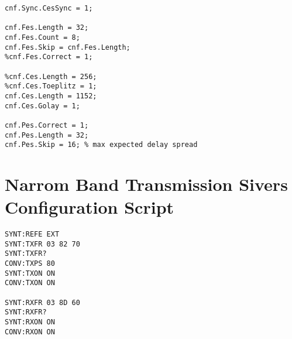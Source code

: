 \begin{appendix}
\begin{verbatim}
cnf.Sync.CesSync = 1;

cnf.Fes.Length = 32;
cnf.Fes.Count = 8;
cnf.Fes.Skip = cnf.Fes.Length;
%cnf.Fes.Correct = 1;

%cnf.Ces.Length = 256;
%cnf.Ces.Toeplitz = 1;
cnf.Ces.Length = 1152;
cnf.Ces.Golay = 1;

cnf.Pes.Correct = 1;
cnf.Pes.Length = 32;
cnf.Pes.Skip = 16; % max expected delay spread
\end{verbatim}

\chapter{Narrom Band Transmission Sivers Configuration Script}
\label{app:res_450_sivers_on}
\begin{verbatim}
SYNT:REFE EXT
SYNT:TXFR 03 82 70
SYNT:TXFR?
CONV:TXPS 80
SYNT:TXON ON
CONV:TXON ON

SYNT:RXFR 03 8D 60
SYNT:RXFR?
SYNT:RXON ON
CONV:RXON ON
\end{verbatim}

\end{appendix}
